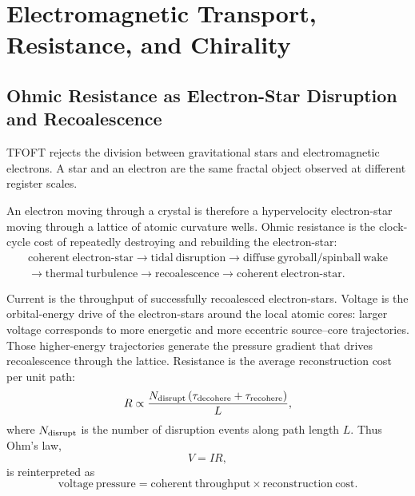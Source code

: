 \documentclass[11pt,a4paper]{article}
\begin{document}

\section{Electromagnetic Transport, Resistance, and Chirality}




\subsection{Ohmic Resistance as Electron-Star Disruption and Recoalescence}

TFOFT rejects the division between gravitational stars and electromagnetic
electrons. A star and an electron are the same fractal object observed at
different register scales.

An electron moving through a crystal is therefore a hypervelocity
electron-star moving through a lattice of atomic curvature wells. Ohmic
resistance is the clock-cycle cost of repeatedly destroying and rebuilding
the electron-star:
\begin{equation}
\begin{gathered}
\mathrm{coherent\ electron\mbox{-}star}
\rightarrow
\mathrm{tidal\ disruption}
\rightarrow
\mathrm{diffuse\ gyroball/spinball\ wake}\\
\rightarrow
\mathrm{thermal\ turbulence}
\rightarrow
\mathrm{recoalescence}
\rightarrow
\mathrm{coherent\ electron\mbox{-}star}.
\end{gathered}
\end{equation}

Current is the throughput of successfully recoalesced electron-stars.
Voltage is the orbital-energy drive of the electron-stars around the local atomic cores: larger voltage corresponds to more energetic and more eccentric source--core trajectories. Those higher-energy trajectories generate the pressure gradient that drives recoalescence through the lattice.
Resistance is the average reconstruction cost per unit path:
\begin{equation}
R
\propto
\frac{
N_{\rm disrupt}
\left(
\tau_{\rm decohere}
+
\tau_{\rm recohere}
\right)
}
{L},
\end{equation}
where \(N_{\rm disrupt}\) is the number of disruption events along path
length \(L\). Thus Ohm's law,
\begin{equation}
V=IR,
\end{equation}
is reinterpreted as
\begin{equation}
\mathrm{voltage\ pressure}
=
\mathrm{coherent\ throughput}
\times
\mathrm{reconstruction\ cost}.
\end{equation}
\end{document}
